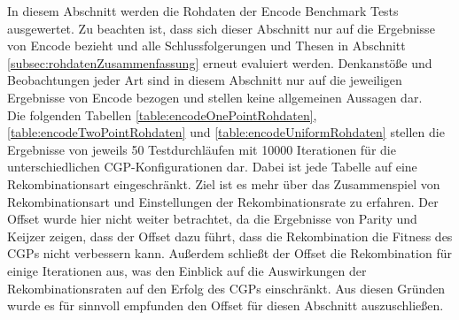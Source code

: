 In diesem Abschnitt werden die Rohdaten der Encode Benchmark Tests ausgewertet.
Zu beachten ist, dass sich dieser Abschnitt nur auf die Ergebnisse von Encode bezieht und alle Schlussfolgerungen und Thesen in Abschnitt \ref{subsec:rohdatenZusammenfassung} erneut evaluiert werden.
Denkanstöße und Beobachtungen jeder Art sind in diesem Abschnitt nur auf die jeweiligen Ergebnisse von Encode bezogen und stellen keine allgemeinen Aussagen dar.\\
Die folgenden Tabellen \ref{table:encodeOnePointRohdaten}, \ref{table:encodeTwoPointRohdaten} und \ref{table:encodeUniformRohdaten} stellen die Ergebnisse von jeweils 50 Testdurchläufen mit 10000 Iterationen für die unterschiedlichen CGP-Konfigurationen dar. 
Dabei ist jede Tabelle auf eine Rekombinationsart eingeschränkt.
Ziel ist es mehr über das Zusammenspiel von Rekombinationsart und Einstellungen der Rekombinationsrate zu erfahren.
Der Offset wurde hier nicht weiter betrachtet, da die Ergebnisse von Parity und Keijzer zeigen, dass der Offset dazu führt, dass die Rekombination die Fitness des CGPs nicht verbessern kann.
Außerdem schließt der Offset die Rekombination für einige Iterationen aus, was den Einblick auf die Auswirkungen der Rekombinationsraten auf den Erfolg des CGPs einschränkt.
Aus diesen Gründen wurde es für sinnvoll empfunden den Offset für diesen Abschnitt auszuschließen.

